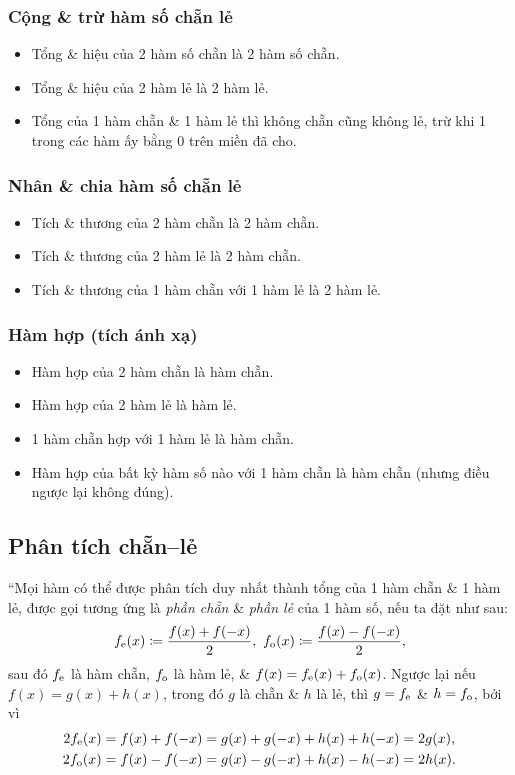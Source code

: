 \documentclass[oneside]{book}
\numberwithin{equation}{section}
\begin{document}
\subsubsection{Cộng \& trừ hàm số chẵn lẻ}
\begin{itemize}
	\item Tổng \& hiệu của 2 hàm số chẵn là 2 hàm số chẵn.
	\item Tổng \& hiệu của 2 hàm lẻ là 2 hàm lẻ.
	\item Tổng của 1 hàm chẵn \& 1 hàm lẻ thì không chẵn cũng không lẻ, trừ khi 1 trong các hàm ấy bằng $0$ trên miền đã cho.
\end{itemize}

\subsubsection{Nhân \& chia hàm số chẵn lẻ}
\begin{itemize}
	\item Tích \& thương của 2 hàm chẵn là 2 hàm chẵn.
	\item Tích \& thương của 2 hàm lẻ là 2 hàm chẵn.
	\item Tích \& thương của 1 hàm chẵn với 1 hàm lẻ là 2 hàm lẻ.
\end{itemize}

\subsubsection{Hàm hợp (tích ánh xạ)}
\begin{itemize}
	\item Hàm hợp của 2 hàm chẵn là hàm chẵn.
	\item Hàm hợp của 2 hàm lẻ là hàm lẻ.
	\item 1 hàm chẵn hợp với 1 hàm lẻ là hàm chẵn.
	\item Hàm hợp của bất kỳ hàm số nào với 1 hàm chẵn là hàm chẵn (nhưng điều ngược lại không đúng).
\end{itemize}

\subsection{Phân tích chẵn--lẻ}
``Mọi hàm có thể được phân tích duy nhất thành tổng của 1 hàm chẵn \& 1 hàm lẻ, được gọi tương ứng là \textit{phần chẵn} \& \textit{phần lẻ} của 1 hàm số, nếu ta đặt như sau:
\begin{align*}
	f_{\rm e}(x)\coloneqq\frac{f(x) + f(-x)}{2},\ f_{\rm o}(x)\coloneqq\frac{f(x) - f(-x)}{2},
\end{align*}
sau đó $f_{\rm e}$ là hàm chẵn, $f_{\rm o}$ là hàm lẻ, \& $f(x) = f_{\rm e}(x) + f_{\rm o}(x)$. Ngược lại nếu $f(x) = g(x) + h(x)$, trong đó $g$ là chẵn \& $h$ là lẻ, thì $g = f_{\rm e}$ \& $h = f_{\rm o}$, bởi vì
\begin{align*}
	2f_{\rm e}(x) &= f(x) + f(-x) = g(x) + g(-x) + h(x) + h(-x) = 2g(x),\\
	2f_{\rm o}(x) &= f(x) - f(-x) = g(x) - g(-x) + h(x) - h(-x) = 2h(x).
\end{align*}
\end{document}
